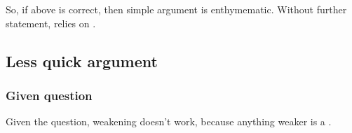 \begin{note}
  So, if above is correct, then simple argument is enthymematic.
  Without further statement, relies on .
\end{note}

\subsection{Less quick argument}
\label{sec:less-quick-argument}

\subsubsection{Given question}
\label{sec:given-question}

\begin{note}
  Given the question, weakening doesn't work, because anything weaker is a \requ{}.
\end{note}

